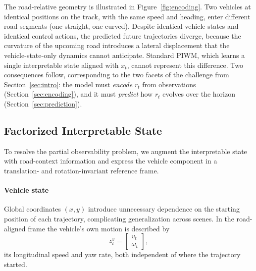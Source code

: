 \documentclass[preprint,12pt]{elsarticle}
\newcommand{\zv}{z^{v}}      %
\begin{document}
The road-relative geometry is illustrated in Figure~\ref{fig:encoding}.
Two vehicles at identical positions on the track, with the same speed and
heading, enter different road segments (one straight, one curved).
Despite identical vehicle states and identical control actions, the predicted
future trajectories diverge, because the curvature of the upcoming road
introduces a lateral displacement that the vehicle-state-only dynamics cannot
anticipate.
Standard PIWM, which learns a single interpretable state aligned with $x_t$,
cannot represent this difference.
Two consequences follow, corresponding to the two facets of the challenge from
Section~\ref{sec:intro}: the model must \emph{encode} $r_t$ from observations
(Section~\ref{sec:encoding}), and it must \emph{predict} how $r_t$ evolves over
the horizon (Section~\ref{sec:prediction}).



\subsection{Factorized Interpretable State}\label{sec:factorized_state}

To resolve the partial observability problem, we augment the interpretable state
with road-context information and express the vehicle component in a translation-
and rotation-invariant reference frame.

\paragraph{Vehicle state}
Global coordinates $(x, y)$ introduce unnecessary dependence on the starting
position of each trajectory, complicating generalization across scenes.
In the road-aligned frame the vehicle's own motion is described by
\begin{equation}
    \zv_t =
    \begin{bmatrix}
        v_t \\ \omega_t
    \end{bmatrix},
    \label{eq:vehicle_rel}
\end{equation}
its longitudinal speed and yaw rate, both independent of where the trajectory
started.
\end{document}
